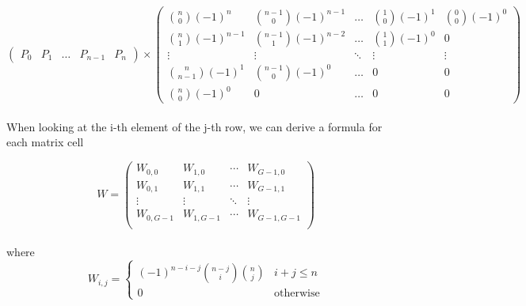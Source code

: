 \begin{equation*}
    \begin{pmatrix*}
        P_0 & P_1 & \dots & P_{n-1} & P_{n}
    \end{pmatrix*}
    \times
    \begin{pmatrix*}
        {n \choose 0}(-1)^{n}   & {n-1 \choose 0}(-1)^{n-1}  & \hdots & {1 \choose 0}(-1)^{1} & {0 \choose 0}(-1)^{0} \\
        {n \choose 1}(-1)^{n-1} & {n-1 \choose 1}(-1)^{n-2}  & \hdots & {1 \choose 1}(-1)^{0} & 0                     \\
        \vdots                  & \vdots                     & \ddots & \vdots                & \vdots                \\
        {n \choose n-1}(-1)^{1} & {n-1 \choose 0}(-1)^{0}    & \hdots & 0                     & 0                     \\
        {n \choose 0}(-1)^{0}   & 0                          & \hdots & 0                     & 0
    \end{pmatrix*}
\end{equation*}
\\
When looking at the i-th element of the j-th row, we can derive a formula for each matrix cell

\begin{equation*}
    W=
    \left(
    \begin{array}{cccc}
        W_{0,0}   & W_{1,0}   & \cdots & W_{G-1,0}   \\
        W_{0,1}   & W_{1,1}   & \cdots & W_{G-1,1}   \\
        \vdots    & \vdots    & \ddots & \vdots      \\
        W_{0,G-1} & W_{1,G-1} & \cdots & W_{G-1,G-1} \\
    \end{array}
    \right)
\end{equation*}
\\
where
\\
\begin{equation*}
    W_{i,j}=\begin{cases}
        (-1)^{n-i-j} {n-j \choose i} {n \choose j} & i + j \le n      \\
        0                                            & \text{otherwise}
    \end{cases}
\end{equation*}